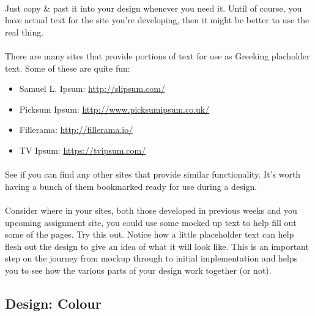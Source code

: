 \documentclass[10pt, a4paper, twosize]{article}
\begin{document}
\paragraph{} Just copy \& past it into your design whenever you need it. Until of course, you have actual text for the site you're developing, then it might be better to use the real thing.

\paragraph{} There are many sites that provide portions of text for use as Greeking placholder text. Some of these are quite fun:

\begin{itemize}
\item Samuel L. Ipsum: \url{http://slipsum.com/}
\item Picksum Ipsum: \url{http://www.picksumipsum.co.uk/}
\item Fillerama: \url{http://fillerama.io/}
\item TV Ipsum: \url{https://tvipsum.com/}
\end{itemize}

\paragraph{} See if you can find any other sites that provide similar functionality. It's worth having a bunch of them bookmarked ready for use during a design.

\paragraph{} Consider where in your sites, both those developed in previous weeks and you upcoming assignment site, you could use some mocked up text to help fill out some of the pages. Try this out. Notice how a little placeholder text can help flesh out the design to give an idea of what it will look like. This is an important step on the journey from mockup through to initial implementation and helps you to see how the various parts of your design work together (or not).

\subsection{Design: Colour}
\end{document}
